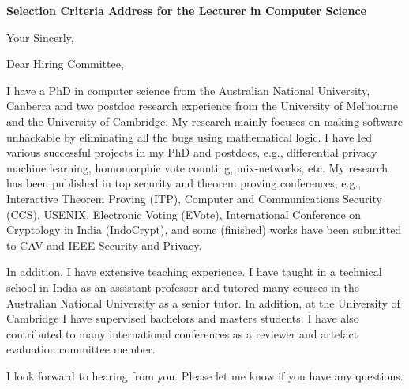 \documentclass[11pt,a4paper,roman]{moderncv}
\begin{document}
\date{}
\opening{\textbf{Selection Criteria Address for the Lecturer 
in Computer Science}}
\closing{Your Sincerly, \vspace{-1em}}



\makelettertitle

Dear Hiring Committee, 

I have a PhD in computer science from the Australian National University, 
Canberra and two postdoc research experience from the University of 
Melbourne and the University of Cambridge. My research 
mainly focuses on making software unhackable by eliminating all 
the bugs using mathematical logic. I have led various successful projects
in my PhD and postdocs, e.g., differential privacy machine learning, 
homomorphic vote counting, mix-networks, etc.  My research has been 
published in top security and theorem proving conferences, e.g., 
Interactive Theorem Proving (ITP), 
Computer and Communications Security (CCS), USENIX, Electronic Voting (EVote), 
International Conference on Cryptology in India (IndoCrypt),
and some (finished) works have been submitted to CAV and IEEE Security and Privacy. 

In addition, I have extensive teaching experience. I have taught in 
a technical school in India as an assistant professor and tutored 
many courses in the Australian National University as a senior tutor.
In addition, at the University of Cambridge I have supervised bachelors and masters students.
I have also contributed to many international conferences 
as a reviewer and artefact evaluation committee member.



I look forward to hearing from you. Please let me know if you have any questions. \\
 


\makeletterclosing
\end{document}
